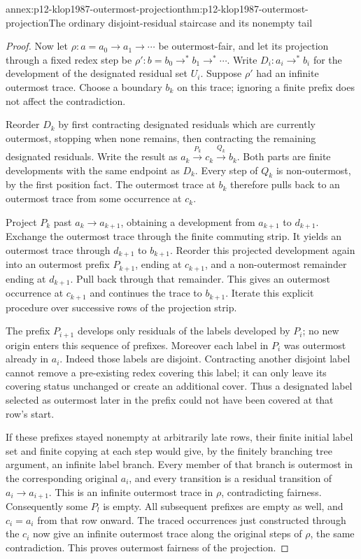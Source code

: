 \begin{annexitem}{annex:p12-klop1987-outermost-projection}{thm:p12-klop1987-outermost-projection}{The ordinary disjoint-residual staircase and its nonempty tail}
\begin{proof}
Now let \(\rho:a=a_0\to a_1\to\cdots\) be outermost-fair,
and let its projection through a fixed redex step be
\(\rho':b=b_0\to^*b_1\to^*\cdots\). Write
\(D_i:a_i\to^*b_i\) for the development of the designated residual
set \(U_i\). Suppose \(\rho'\) had an infinite outermost trace.
Choose a boundary \(b_k\) on this trace; ignoring a finite prefix
does not affect the contradiction.

Reorder \(D_k\) by first contracting designated residuals which are
currently outermost, stopping when none remains, then contracting the
remaining designated residuals. Write the result as
\(a_k\xrightarrow{P_k}c_k\xrightarrow{Q_k}b_k\).
Both parts are finite developments with the same endpoint as \(D_k\).
Every step of \(Q_k\) is non-outermost, by the first position fact.
The outermost trace at \(b_k\) therefore pulls back to an outermost
trace from some occurrence at \(c_k\).

Project \(P_k\) past \(a_k\to a_{k+1}\), obtaining a development
from \(a_{k+1}\) to \(d_{k+1}\). Exchange the outermost trace
through the finite commuting strip. It yields an outermost trace through
\(d_{k+1}\) to \(b_{k+1}\). Reorder this projected development
again into an outermost prefix \(P_{k+1}\), ending at \(c_{k+1}\),
and a non-outermost remainder ending at \(d_{k+1}\). Pull back through
that remainder. This gives an outermost occurrence at \(c_{k+1}\)
and continues the trace to \(b_{k+1}\). Iterate this explicit procedure
over successive rows of the projection strip.

The prefix \(P_{i+1}\) develops only residuals of the labels developed
by \(P_i\); no new origin enters this sequence of prefixes. Moreover
each label in \(P_i\) was outermost already in \(a_i\).
Indeed those labels are disjoint. Contracting another disjoint label
cannot remove a pre-existing redex covering this label; it can only
leave its covering status unchanged or create an additional cover.
Thus a designated label selected as outermost later in the prefix could
not have been covered at that row's start.

If these prefixes stayed nonempty at arbitrarily late rows, their finite
initial label set and finite copying at each step would give, by the
finitely branching tree argument, an infinite label branch. Every
member of that branch is outermost in the corresponding original
\(a_i\), and every transition is a residual transition of
\(a_i\to a_{i+1}\). This is an infinite outermost trace in
\(\rho\), contradicting fairness. Consequently some \(P_l\)
is empty. All subsequent prefixes are empty as well, and
\(c_i=a_i\) from that row onward. The traced occurrences just
constructed through the \(c_i\) now give an infinite outermost trace
along the original steps of \(\rho\), the same contradiction.
This proves outermost fairness of the projection.


\end{proof}
\end{annexitem}
